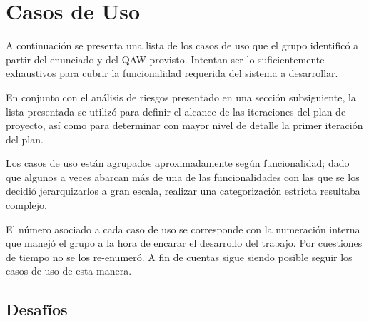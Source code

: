 \section{Casos de Uso}
\label{sec:casosdeuso}
A continuación se presenta una lista de los casos de uso que el grupo identificó a partir del enunciado y del QAW provisto. Intentan ser lo suficientemente exhaustivos para cubrir la funcionalidad requerida del sistema a desarrollar.

En conjunto con el análisis de riesgos presentado en una sección subsiguiente, la lista presentada se utilizó para definir el alcance de las iteraciones del plan de proyecto, así como para determinar con mayor nivel de detalle la primer iteración del plan.

Los casos de uso están agrupados aproximadamente según funcionalidad; dado que algunos a veces abarcan más de una de las funcionalidades con las que se los decidió jerarquizarlos a gran escala, realizar una categorización estricta resultaba complejo.

El número asociado a cada caso de uso se corresponde con la numeración interna que manejó el grupo a la hora de encarar el desarrollo del trabajo. Por cuestiones de tiempo no se los re-enumeró. A fin de cuentas sigue siendo posible seguir los casos de uso de esta manera.




\subsection{Desafíos}
